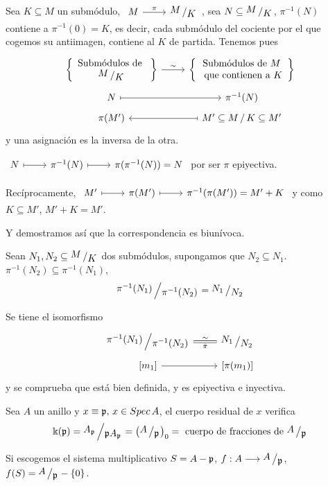 Sea $K\subseteq M$ un subm\'odulo, $\bt M \rar{\pi} & \modulo{M}{K} \et$, sea $N \subseteq  \modulo{M}{K}$, $\pi^{-1}(N)$ contiene a $\pi^{-1}(0) = K$, es decir, cada subm\'odulo del cociente por el que cogemos su antiimagen, contiene al $K$ de partida. Tenemos pues
$$\bt \left\{ \begin{array}{c}
    \text{Subm\'odulos de }  \\
      \modulo{M}{K}
\end{array} \right\} \rar{\sim} & \left\{ \begin{array}{c}
    \text{Subm\'odulos de } M  \\
     \text{ que contienen a } K
\end{array} \right\} \\[-5mm] 
N \rar[mapsto] & \pi^{-1}(N) \\[-5mm] 
\pi(M') & \arrow[mapsto]{l} M'\subseteq M \, / \, K \subseteq M'
\et$$
y una asignaci\'on es la inversa de la otra.
\begin{dem}
    $\bt N \rar[mapsto] & \pi^{-1}(N) \rar[mapsto] & \pi(\pi^{-1}(N)) = N \et$ por ser $\pi$ epiyectiva.

    Rec\'iprocamente, $\bt M' \rar[mapsto] & \pi(M') \rar[mapsto] & \pi^{-1}(\pi(M')) = M'+K \et$ y como $K \subseteq M'$, $M'+K = M'$.  

    Y demostramos as\'i que la correspondencia es biun\'ivoca.

    
\end{dem}
\begin{prop}
    Sean $N_1, N_2 \subseteq \modulo{M}{K}$ dos subm\'odulos, supongamos que $N_2\subseteq N_1$. $\pi^{-1}(N_2)\subseteq \pi^{-1}(N_1)$, 
    $$\modulo{\pi^{-1}(N_1)}{\pi^{-1}(N_2)} = \modulo{N_1}{N_2}$$
\end{prop}
\begin{dem}
    Se tiene el isomorfismo
    $$\bt \modulo{\pi^{-1}(N_1)}{\pi^{-1}(N_2)} \rar[equal]{\sim}[swap]{\bar \pi} &  \modulo{N_1}{N_2} \\[-5mm] \left[m_1\right] \rar & \left[ \pi(m_1) \right]\et$$
    y se comprueba que est\'a bien definida, y es epiyectiva e inyectiva. 
\end{dem}

Sea $A$ un anillo y $x\equiv \mathfrak{p}, \, x\in Spec\, A$, el cuerpo residual de $x$ verifica
$$\Bbbk(\p) = \modulo{A_{\p}}{\p A_\p} = \left( \modulo{A}{\p} \right)_0 = \text{ cuerpo de fracciones de }\modulo{A}{\p}$$

Si escogemos el sistema multiplicativo $S = A-\mathfrak{p}$, $f: A\longrightarrow \modulo{A}{\p}$, $f(S) = \modulo{A}{\p} - \{0\}$. 
\cleardoublepage

